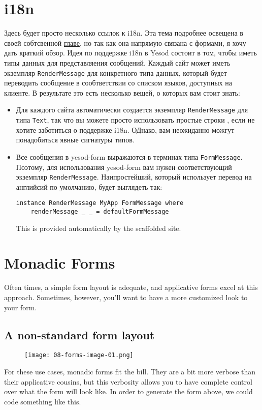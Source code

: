 \section{i18n}
Здесь будет просто несколько ссылок к i18n. Эта тема подробнее освещена в своей
собтсвенной  \hyperref[ch:i18n]{главе},
но так как она напрямую связана с формами, я хочу дать краткий обзор. 
Идея по поддержке i18n в Yesod состоит в том, чтобы иметь типы данных для представляения
сообщений. Каждый сайт может иметь экземпляр \lstinline'RenderMessage' для конкретного
типа данных, который будет переводить сообщение в сообтветствии со списком языков,
доступных на клиенте. В результате это есть несколько вещей, о которых вам стоит знать:
\begin{itemize}
\item  Для каждого сайта автоматически создается экземпляр \lstinline'RenderMessage' для
типа \lstinline'Text', так что вы можете просто использовать простые строки , если не
хотите заботиться о поддержке i18n. ОДнако, вам неожиданно можгут понадобиться явные
сигнатуры типов.
\item Все сообщения в yesod-form выражаются в терминах типа \lstinline'FormMessage'.
Поэтому, для использования yesod-form вам нужен соответствующий экземпляр 
\lstinline'RenderMessage'. Наипростейший, который использует перевод на английсий по
умолчанию, будет выглядеть так:
\begin{lstlisting}
instance RenderMessage MyApp FormMessage where
    renderMessage _ _ = defaultFormMessage
\end{lstlisting}
This is provided automatically by the scaffolded site.
\end{itemize}

\section{Monadic Forms}

Often times, a simple form layout is adequate, and applicative forms excel at this
approach. Sometimes, however, you'll want to have a more customized look to your form.

\subsection{A non-standard form layout}
\begin{remark}
\begin{figure}[tbph]
  \centering
  \caption{}
  \texttt{[image: 08-forms-image-01.png]}
\end{figure}
\end{remark}
For these use cases, monadic forms fit the bill. They are a bit more verbose than their
applicative cousins, but this verbosity allows you to have complete control over what the
form will look like. In order to generate the form above, we could code something like
this.

